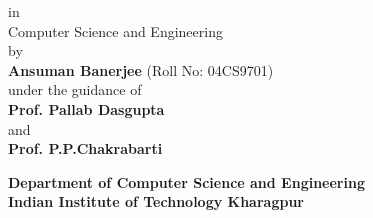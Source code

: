 \documentclass[a4paper, 11pt]{article}
\begin{document}
\begin{titlepage}
\begin {center}
{in}\\
{\large Computer Science and Engineering}\\
\vspace {.5in}
\large
{by}\\
\vspace{.1in}
{\bf Ansuman Banerjee} (Roll No: 04CS9701) \\
\vspace {.1in}
{under the guidance of}\\
\vspace{.5in}
{\bf Prof. Pallab Dasgupta} \\
\vspace {.1in}
{and} \\
\vspace {.1in}
{\bf Prof. P.P.Chakrabarti} \\
\vspace{.5in}
\begin{figure}[htbp]
{\centering {} \par}
\end{figure}

{
{\bf Department of Computer Science and Engineering}\\
{\bf Indian Institute of Technology Kharagpur}\\
}
\end {center}
\end{titlepage}
\newpage
\tableofcontents
\newpage
\end{document}
